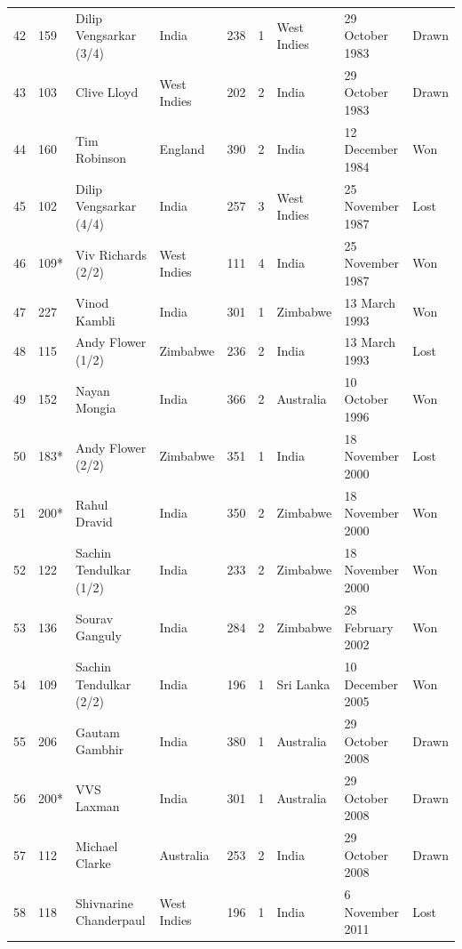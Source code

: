 \documentclass{article}
\begin{document}
\begin{tabular}{lllllllll}
42 & 159 & Dilip Vengsarkar (3/4) & India & 238 & 1 & West Indies & 29 October 1983 & Drawn \\
43 & 103 & Clive Lloyd & West Indies & 202 & 2 & India & 29 October 1983 & Drawn \\
44 & 160 & Tim Robinson & England & 390 & 2 & India & 12 December 1984 & Won \\
45 & 102 & Dilip Vengsarkar (4/4) & India & 257 & 3 & West Indies & 25 November 1987 & Lost \\
46 & 109* & Viv Richards (2/2) & West Indies & 111 & 4 & India & 25 November 1987 & Won \\
47 & 227 & Vinod Kambli & India & 301 & 1 & Zimbabwe & 13 March 1993 & Won \\
48 & 115 & Andy Flower (1/2) & Zimbabwe & 236 & 2 & India & 13 March 1993 & Lost \\
49 & 152 & Nayan Mongia & India & 366 & 2 & Australia & 10 October 1996 & Won \\
50 & 183* & Andy Flower (2/2) & Zimbabwe & 351 & 1 & India & 18 November 2000 & Lost \\
51 & 200* & Rahul Dravid & India & 350 & 2 & Zimbabwe & 18 November 2000 & Won \\
52 & 122 & Sachin Tendulkar (1/2) & India & 233 & 2 & Zimbabwe & 18 November 2000 & Won \\
53 & 136 & Sourav Ganguly & India & 284 & 2 & Zimbabwe & 28 February 2002 & Won \\
54 & 109 & Sachin Tendulkar (2/2) & India & 196 & 1 & Sri Lanka & 10 December 2005 & Won \\
55 & 206 & Gautam Gambhir & India & 380 & 1 & Australia & 29 October 2008 & Drawn \\
56 & 200* & VVS Laxman & India & 301 & 1 & Australia & 29 October 2008 & Drawn \\
57 & 112 & Michael Clarke & Australia & 253 & 2 & India & 29 October 2008 & Drawn \\
58 & 118 & Shivnarine Chanderpaul & West Indies & 196 & 1 & India & 6 November 2011 & Lost \\
\bottomrule
\end{tabular}
\end{document}

